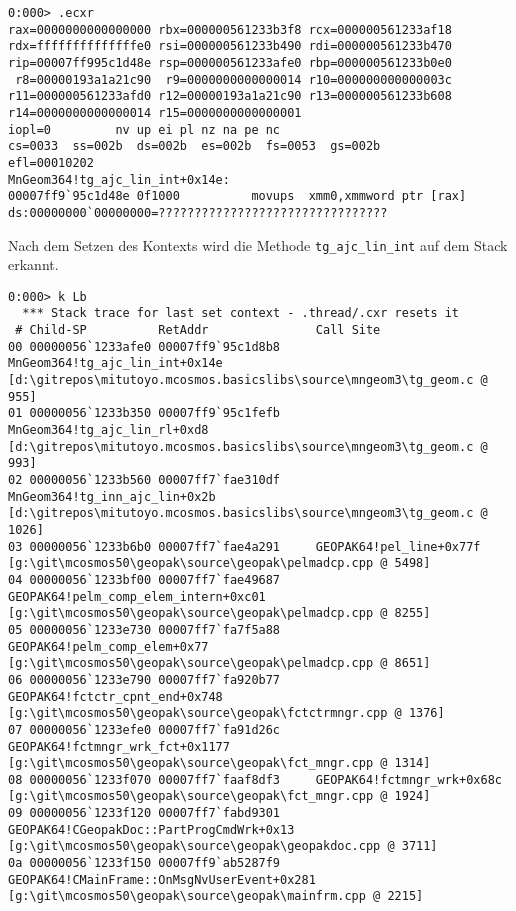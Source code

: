 \begin{lstlisting}
0:000> .ecxr
rax=0000000000000000 rbx=000000561233b3f8 rcx=000000561233af18
rdx=ffffffffffffffe0 rsi=000000561233b490 rdi=000000561233b470
rip=00007ff995c1d48e rsp=000000561233afe0 rbp=000000561233b0e0
 r8=00000193a1a21c90  r9=0000000000000014 r10=000000000000003c
r11=000000561233afd0 r12=00000193a1a21c90 r13=000000561233b608
r14=0000000000000014 r15=0000000000000001
iopl=0         nv up ei pl nz na pe nc
cs=0033  ss=002b  ds=002b  es=002b  fs=0053  gs=002b             efl=00010202
MnGeom364!tg_ajc_lin_int+0x14e:
00007ff9`95c1d48e 0f1000          movups  xmm0,xmmword ptr [rax] ds:00000000`00000000=????????????????????????????????
\end{lstlisting}

Nach dem Setzen des Kontexts wird die Methode \verb|tg_ajc_lin_int| auf dem Stack erkannt.

\begin{lstlisting}
0:000> k Lb
  *** Stack trace for last set context - .thread/.cxr resets it
 # Child-SP          RetAddr               Call Site
00 00000056`1233afe0 00007ff9`95c1d8b8     MnGeom364!tg_ajc_lin_int+0x14e [d:\gitrepos\mitutoyo.mcosmos.basicslibs\source\mngeom3\tg_geom.c @ 955] 
01 00000056`1233b350 00007ff9`95c1fefb     MnGeom364!tg_ajc_lin_rl+0xd8 [d:\gitrepos\mitutoyo.mcosmos.basicslibs\source\mngeom3\tg_geom.c @ 993] 
02 00000056`1233b560 00007ff7`fae310df     MnGeom364!tg_inn_ajc_lin+0x2b [d:\gitrepos\mitutoyo.mcosmos.basicslibs\source\mngeom3\tg_geom.c @ 1026] 
03 00000056`1233b6b0 00007ff7`fae4a291     GEOPAK64!pel_line+0x77f [g:\git\mcosmos50\geopak\source\geopak\pelmadcp.cpp @ 5498] 
04 00000056`1233bf00 00007ff7`fae49687     GEOPAK64!pelm_comp_elem_intern+0xc01 [g:\git\mcosmos50\geopak\source\geopak\pelmadcp.cpp @ 8255] 
05 00000056`1233e730 00007ff7`fa7f5a88     GEOPAK64!pelm_comp_elem+0x77 [g:\git\mcosmos50\geopak\source\geopak\pelmadcp.cpp @ 8651] 
06 00000056`1233e790 00007ff7`fa920b77     GEOPAK64!fctctr_cpnt_end+0x748 [g:\git\mcosmos50\geopak\source\geopak\fctctrmngr.cpp @ 1376] 
07 00000056`1233efe0 00007ff7`fa91d26c     GEOPAK64!fctmngr_wrk_fct+0x1177 [g:\git\mcosmos50\geopak\source\geopak\fct_mngr.cpp @ 1314] 
08 00000056`1233f070 00007ff7`faaf8df3     GEOPAK64!fctmngr_wrk+0x68c [g:\git\mcosmos50\geopak\source\geopak\fct_mngr.cpp @ 1924] 
09 00000056`1233f120 00007ff7`fabd9301     GEOPAK64!CGeopakDoc::PartProgCmdWrk+0x13 [g:\git\mcosmos50\geopak\source\geopak\geopakdoc.cpp @ 3711] 
0a 00000056`1233f150 00007ff9`ab5287f9     GEOPAK64!CMainFrame::OnMsgNvUserEvent+0x281 [g:\git\mcosmos50\geopak\source\geopak\mainfrm.cpp @ 2215] 
\end{lstlisting}

